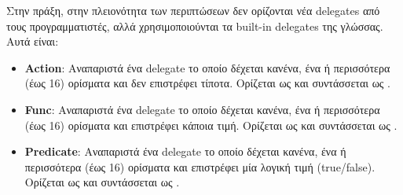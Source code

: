 




Στην πράξη, στην πλειονότητα των περιπτώσεων δεν ορίζονται νέα delegates από τους προγραμματιστές, αλλά χρησιμοποιούνται τα built-in delegates της γλώσσας. Αυτά είναι:

\begin{itemize}
\item \textbf{Action}: Αναπαριστά ένα delegate το οποίο δέχεται κανένα, ένα ή περισσότερα (έως 16) ορίσματα και δεν επιστρέφει τίποτα. Ορίζεται ως 
\newline 
{} 
\newline 
και συντάσσεται ως 
\newline 
{}.

\item \textbf{Func}: Αναπαριστά ένα delegate το οποίο δέχεται κανένα, ένα ή περισσότερα (έως 16) ορίσματα και επιστρέφει κάποια τιμή. Ορίζεται ως 
\newline 
{} 
\newline 
και συντάσσεται ως 
\newline 
{}.

\item \textbf{Predicate}: Αναπαριστά ένα delegate το οποίο δέχεται κανένα, ένα ή περισσότερα (έως 16) ορίσματα και επιστρέφει μία λογική τιμή (true/false). Ορίζεται ως 
\newline 
{} 
\newline 
και συντάσσεται ως 
\newline 
{}.

\end{itemize}
